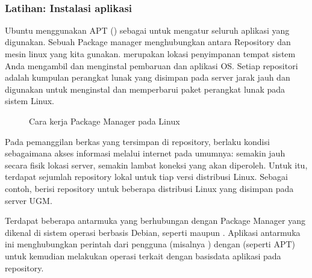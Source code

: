 \documentclass[letterpaper,10pt,english]{sphinxmanual}
\begin{document}
 


\subsubsection{Latihan: Instalasi aplikasi}
\label{\detokenize{sesi1/arsitektur:latihan-instalasi-aplikasi}}
Ubuntu menggunakan APT () sebagai  untuk mengatur seluruh aplikasi yang digunakan. Sebuah Package manager menghubungkan antara Repository dan mesin linux yang kita gunakan.  merupakan lokasi penyimpanan tempat sistem Anda mengambil dan menginstal pembaruan dan aplikasi OS. Setiap repositori adalah kumpulan perangkat lunak yang disimpan pada server jarak jauh dan digunakan untuk menginstal dan memperbarui paket perangkat lunak pada sistem Linux.

\begin{figure}[htbp]
\centering
\capstart

\noindent{}
\caption{Cara kerja Package Manager pada Linux}\label{\detokenize{sesi1/arsitektur:apt}}\end{figure}

Pada pemanggilan berkas yang tersimpan di repository, berlaku kondisi sebagaimana akses informasi melalui internet pada umumnya: semakin jauh secara fisik lokasi server, semakin lambat koneksi yang akan diperoleh. Untuk itu, terdapat sejumlah repository lokal untuk tiap versi distribusi Linux. Sebagai contoh,  berisi repository untuk beberapa distribusi Linux yang disimpan pada server UGM.

Terdapat beberapa antarmuka yang berhubungan dengan Package Manager yang dikenal di sistem operasi berbasis Debian, seperti  maupun . Aplikasi antarmuka ini menghubungkan perintah dari pengguna (misalnya ) dengan  (seperti APT) untuk kemudian melakukan operasi terkait dengan basisdata aplikasi pada repository.
\end{document}
